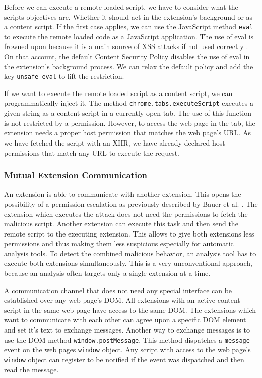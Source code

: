 	Before we can execute a remote loaded script, we have to consider what the scripts objectives are. Whether it should act in the extension's background or as a content script. If the first case applies, we can use the JavaScript method \texttt{eval} to execute the remote loaded code as a JavaScript application. The use of eval is frowned upon because it is a main source of XSS attacks if not used correctly \cite{mozillaDangerousEval}. On that account, the default Content Security Policy disables the use of eval in the extension's background process. We can relax the default policy and add the key \texttt{unsafe\_eval} to lift the restriction.
	
	If we want to execute the remote loaded script as a content script, we can programmatically inject it. The method \texttt{chrome.tabs.executeScript} executes a given string as a content script in a currently open tab. The use of this function is not restricted by a permission. However, to access the web page in the tab, the extension needs a proper host permission that matches the web page's URL. As we have fetched the script with an XHR, we have already declared host permissions that match any URL to execute the request.
	
\subsubsection{Mutual Extension Communication}
\label{sec:mutalExtensionCommunication}

	An extension is able to communicate with another extension. This opens the possibility of a permission escalation as previously described by Bauer et al. \cite{extensions:cns14}. The extension which executes the attack does not need the permissions to fetch the malicious script. Another extension can execute this task and then send the remote script to the executing extension. This allows to give both extensions less permissions and thus making them less suspicious especially for automatic analysis tools. To detect the combined malicious behavior, an analysis tool has to execute both extensions simultaneously. This is a very unconventional approach, because an analysis often targets only a single extension at a time. 
	
	A communication channel that does not need any special interface can be established over any web page's DOM. All extensions with an active content script in the same web page have access to the same DOM. The extensions which want to communicate with each other can agree upon a specific DOM element and set it's text to exchange messages. Another way to exchange messages is to use the DOM method \texttt{window.postMessage}. This method dispatches a \texttt{message} event on the web pages \texttt{window} object. Any script with access to the web page's \texttt{window} object can register to be notified if the event was dispatched and then read the message. 
	
